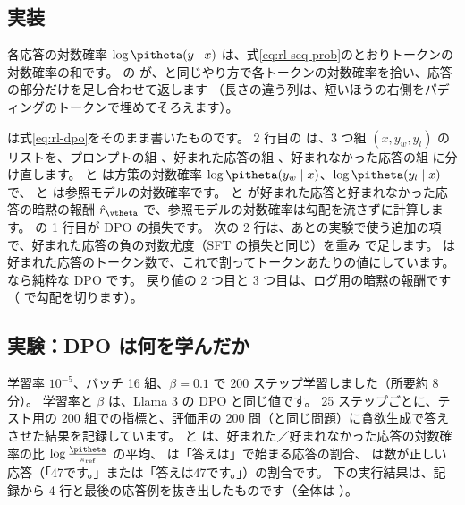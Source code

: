 \subsection{実装}

各応答の対数確率 $\log\pitheta(y\mid x)$ は、式\eqref{eq:rl-seq-prob}のとおりトークンの対数確率の和です。
 の  が、と同じやり方で各トークンの対数確率を拾い、応答の部分だけを足し合わせて返します
（長さの違う列は、短いほうの右側をパディングのトークンで埋めてそろえます）。


は式\eqref{eq:rl-dpo}をそのまま書いたものです。
2 行目の  は、3 つ組 $(x,y_w,y_l)$ のリストを、プロンプトの組 、好まれた応答の組 、好まれなかった応答の組  に分け直します。
 と  は方策の対数確率 $\log\pitheta(y_w\mid x)$、$\log\pitheta(y_l\mid x)$ で、 と  は参照モデルの対数確率です。
 と  が好まれた応答と好まれなかった応答の暗黙の報酬 $\hat r_{\vtheta}$ で、参照モデルの対数確率は勾配を流さずに計算します。
 の 1 行目が DPO の損失です。
次の 2 行は、あとの実験で使う追加の項で、好まれた応答の負の対数尤度（SFT の損失と同じ）を重み  で足します。
 は好まれた応答のトークン数で、これで割ってトークンあたりの値にしています。
 なら純粋な DPO です。
戻り値の 2 つ目と 3 つ目は、ログ用の暗黙の報酬です（ で勾配を切ります）。

\subsection{実験：DPO は何を学んだか}

学習率 $10^{-5}$、バッチ 16 組、$\beta=0.1$ で 200 ステップ学習しました（所要約 8 分）。
学習率と $\beta$ は、Llama 3 の DPO と同じ値です\cite{dubey2024llama3}。
25 ステップごとに、テスト用の 200 組での指標と、評価用の 200 問（と同じ問題）に貪欲生成で答えさせた結果を記録しています。
 と  は、好まれた／好まれなかった応答の対数確率の比 $\log\frac{\pitheta}{\pi_{\text{ref}}}$ の平均、
 は「答えは」で始まる応答の割合、 は数が正しい応答（「47です。」または「答えは47です。」）の割合です。
下の実行結果は、記録から 4 行と最後の応答例を抜き出したものです（全体は ）。

